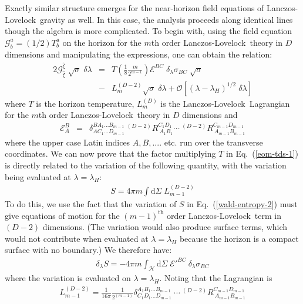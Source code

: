 \documentclass[12pt]{iopart}
\def\l{\left}
\def\r{\right}
\def\DM{\mathrm{d}}
\def\hatxi{\widehat{\xi}}
\def\eq#1{{Eq.~(\ref{#1})}}
\newcommand{\LL}{Lanczos-Lovelock}
\begin{document}
 Exactly similar structure emerges for the near-horizon field equations of \LL\ gravity as well.  
In this case, the analysis proceeds along identical lines though the algebra is more complicated. To begin with, using the field equation $\mathcal{G}^a_b=(1/2)T^a_b$ on the horizon  for the $m$th order \LL\ theory in $D$ dimensions and manipulating the expressions, one can obtain \cite{tpdawoodgentds} the relation:
\begin{eqnarray}
2 \mathcal{G}^{\hatxi}_{\hatxi} \; \sqrt{\sigma} \; \delta \lambda &=& T \l( \frac{1}{8} \frac{m}{2^{m-1}} \r) \mathcal{E}^{B C} \; \delta_{\lambda} \sigma_{B C} \; \sqrt{\sigma} 
\nonumber \\
&-& L^{(D-2)}_m \sqrt{\sigma} \; \delta \lambda + \mathcal{O}[ (\lambda - \lambda_H)^{1/2} \; \delta \lambda] 
\label{eom-tds-1}
\end{eqnarray}
where $T$ is the horizon temperature,  $L^{(D)}_m$ is the \LL\ Lagrangian for the $m$th order \LL\ theory in $D$ dimensions and
\begin{eqnarray}
\mathcal{E}^B_A &=& \delta^{B A_1 \ldots B_{m-1}}_{A C_1 \ldots D_{m-1}} ~ ^{(D-2)}R^{C_1 D_1}_{~ A_1 B_1} \cdots ~ ^{(D-2)}R^{C_{m-1} D_{m-1}}_{~ A_{m-1} B_{m-1}} 
\end{eqnarray}
where the upper case Latin indices $A,B,....$ etc. run over the transverse coordinates.
 We can now prove that the factor multiplying $T$ in \eq{eom-tds-1} is directly related to the variation of the following quantity, with  the variation being evaluated at $\lambda=\lambda_H$:
\begin{eqnarray}
S = 4 \pi m \int \DM \Sigma \; L^{(D-2)}_{m-1} \label{wald-entropy-2} 
\end{eqnarray}
To do this, we  use the fact
 that the variation of  $S$ in  \eq{wald-entropy-2}  must give equations of motion for the $(m-1)^{\mathrm{th}}$ order \LL\ term in $(D-2)$ dimensions. (The variation would also produce surface terms, which would not contribute when evaluated at $\lambda=\lambda_H$ because the horizon is a compact surface with no boundary.) We therefore have:
\begin{eqnarray}
\delta_{\lambda} S = - 4 \pi m \int_\mathcal{H} \DM \Sigma \; \mathcal{E'}^{B C} ~ \delta_{\lambda} \sigma_{B C} 
\end{eqnarray}
where the variation is evaluated  on $\lambda=\lambda_H$. Noting that the Lagrangian is
\begin{eqnarray*}
L^{(D-2)}_{m-1} = \frac{1}{16 \pi} \frac{1}{2^{(m-1)}} \delta^{A_1 B_1 \ldots B_{m-1}}_{C_1 D_1 \ldots D_{m-1}} ~ \cdots ~ ^{(D-2)}R^{C_{m-1} D_{m-1}}_{~ A_{m-1} B_{m-1}} 
\end{eqnarray*}
\end{document}
